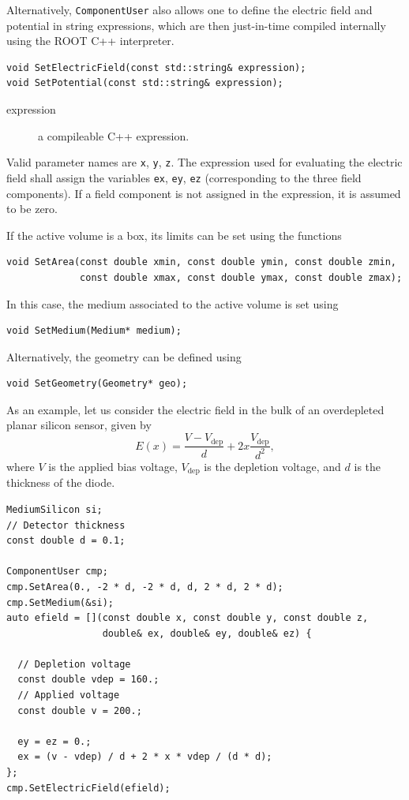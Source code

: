 Alternatively, \texttt{ComponentUser} also allows one to define the 
electric field and potential in string expressions, which are then
just-in-time compiled internally using the ROOT C++ interpreter.
\begin{lstlisting}
void SetElectricField(const std::string& expression);
void SetPotential(const std::string& expression);
\end{lstlisting}
\begin{description}
  \item[expression] a compileable C++ expression.
\end{description}
Valid parameter names are \texttt{x}, \texttt{y}, \texttt{z}. 
The expression used for evaluating the electric field 
shall assign the variables \texttt{ex}, \texttt{ey}, \texttt{ez} 
(corresponding to the three field components). 
If a field component is not assigned in the expression, it is assumed 
to be zero.

If the active volume is a box, its limits can be set using the functions
\begin{lstlisting}
void SetArea(const double xmin, const double ymin, const double zmin,
             const double xmax, const double ymax, const double zmax);
\end{lstlisting}
In this case, the medium associated to the active volume is set using
\begin{lstlisting}
void SetMedium(Medium* medium);
\end{lstlisting}
Alternatively, the geometry can be defined using
\begin{lstlisting}
void SetGeometry(Geometry* geo);
\end{lstlisting}

As an example, let us consider the electric field in the bulk 
of an overdepleted planar silicon sensor, given by
\begin{equation*}
E\left(x\right) = \frac{V - V_{\text{dep}}}{d} + 
                    2x \frac{V_{\text{dep}}}{d^{2}},
\end{equation*}
where \(V\) is the applied bias voltage, \(V_{\text{dep}}\) is 
the depletion voltage, and \(d\) is the thickness of the diode.
\begin{lstlisting}
MediumSilicon si;
// Detector thickness
const double d = 0.1;

ComponentUser cmp;
cmp.SetArea(0., -2 * d, -2 * d, d, 2 * d, 2 * d);
cmp.SetMedium(&si);
auto efield = [](const double x, const double y, const double z,
                 double& ex, double& ey, double& ez) { 

  // Depletion voltage
  const double vdep = 160.;
  // Applied voltage
  const double v = 200.;

  ey = ez = 0.;
  ex = (v - vdep) / d + 2 * x * vdep / (d * d);
};
cmp.SetElectricField(efield);
\end{lstlisting}

